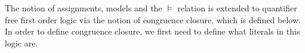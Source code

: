 \documentclass[smallextended]{svjour3}
\begin{document}
%


The notion of assignments, models and the $\models$ relation is extended to quantifier free first order logic via the notion of congruence closure, 
which is defined below.
In order to define congruence closure, we first need to define what literals in this logic are.
\end{document}
